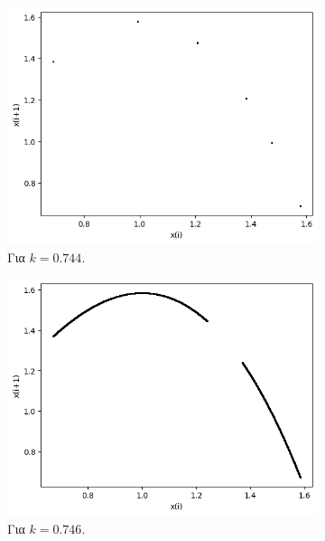 \begin{figure}[h!]
\begin{subfigure}[b]{0.4\textwidth}
		\includegraphics[width=\textwidth]{LateX images/graphs q14/g19}
		\caption{Για $k=0.744$.}
		\label{f:k76}
	\end{subfigure}
	\hfill
	\begin{subfigure}[b]{0.4\textwidth}
		\centering
		\includegraphics[width=\textwidth]{LateX images/graphs q14/g20}
		\caption{Για $k=0.746$.}
		\label{f:k77}
	\end{subfigure}
	\hfill
	\begin{subfigure}[b]{0.4\textwidth}
		\centering

\end{subfigure}
\end{figure}
